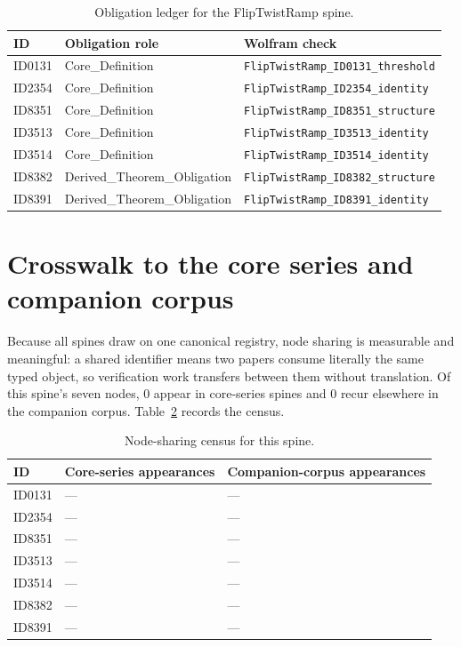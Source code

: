 \documentclass[11pt]{article}
\theoremstyle{remark}
\begin{document}
\begin{table}[ht]
\centering
\small
\caption{Obligation ledger for the FlipTwistRamp spine.}
\label{tab:obligations}
\begin{tabular}{llp{6.2cm}}
\toprule
ID & Obligation role & Wolfram check \\
\midrule
ID0131 & Core\_Definition & \texttt{FlipTwistRamp\_ID0131\_threshold} \\
ID2354 & Core\_Definition & \texttt{FlipTwistRamp\_ID2354\_identity} \\
ID8351 & Core\_Definition & \texttt{FlipTwistRamp\_ID8351\_structure} \\
ID3513 & Core\_Definition & \texttt{FlipTwistRamp\_ID3513\_identity} \\
ID3514 & Core\_Definition & \texttt{FlipTwistRamp\_ID3514\_identity} \\
ID8382 & Derived\_Theorem\_Obligation & \texttt{FlipTwistRamp\_ID8382\_structure} \\
ID8391 & Derived\_Theorem\_Obligation & \texttt{FlipTwistRamp\_ID8391\_identity} \\
\bottomrule
\end{tabular}
\end{table}

\section{Crosswalk to the core series and companion corpus}
\label{sec:crosswalk}

Because all spines draw on one canonical registry, node sharing is measurable and meaningful: a shared identifier means two papers consume literally the same typed object, so verification work transfers between them without translation. Of this spine's seven nodes, 0 appear in core-series spines and 0 recur elsewhere in the companion corpus. Table~\ref{tab:crosswalk} records the census.

\begin{table}[ht]
\centering
\small
\caption{Node-sharing census for this spine.}
\label{tab:crosswalk}
\begin{tabular}{lp{4.4cm}p{6.6cm}}
\toprule
ID & Core-series appearances & Companion-corpus appearances \\
\midrule
ID0131 & --- & --- \\
ID2354 & --- & --- \\
ID8351 & --- & --- \\
ID3513 & --- & --- \\
ID3514 & --- & --- \\
ID8382 & --- & --- \\
ID8391 & --- & --- \\
\bottomrule
\end{tabular}
\end{table}
\end{document}
